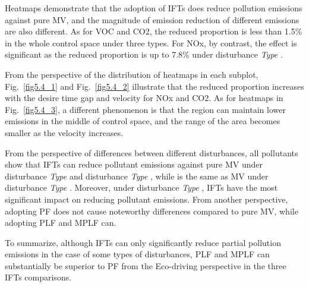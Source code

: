 \documentclass[journal]{IEEEtran}
\begin{document}

Heatmaps demonstrate that the adoption of IFTs does reduce pollution emissions against pure MV, and the magnitude of emission reduction of different emissions are also different. As for VOC and CO2, the reduced proportion is less than 1.5\% in the whole control space under three types. For NOx, by contrast, the effect is significant as the reduced proportion is up to 7.8\% under disturbance \textit{Type \uppercase\expandafter{}}.

From the perspective of the distribution of heatmaps in each subplot, Fig.~\ref{fig5.4_1} and Fig.~\ref{fig5.4_2} illustrate that the reduced proportion increases with the desire time gap and velocity for NOx and CO2. As for heatmaps in Fig.~\ref{fig5.4_3}, a different phenomenon is that the region can maintain lower emissions in the middle of control space, and the range of the area becomes smaller as the velocity increases.

From the perspective of differences between different disturbances, all pollutants show that IFTs can reduce pollutant emissions against pure MV under disturbance \textit{Type \uppercase\expandafter{}} and disturbance \textit{Type \uppercase\expandafter{}}, while is the same as MV under disturbance \textit{Type \uppercase\expandafter{}}. Moreover, under disturbance \textit{Type \uppercase\expandafter{}}, IFTs have the most significant impact on reducing pollutant emissions. From another perspective, adopting PF does not cause noteworthy differences compared to pure MV, while adopting PLF and MPLF can.

To summarize, although IFTs can only significantly reduce partial pollution emissions in the case of some types of disturbances, PLF and MPLF can substantially be superior to PF from the Eco-driving perspective in the three IFTs comparisons.
\end{document}
